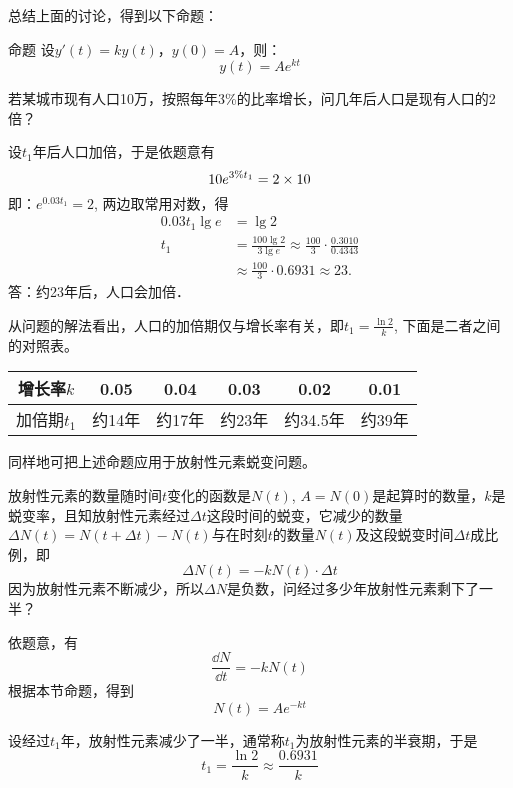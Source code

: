总结上面的讨论，得到以下命题：

\begin{blk}{命题}
    设$y'(t)=ky(t)$，$y(0)=A$，则：
    \[y(t)=Ae^{kt}\]
\end{blk}




\begin{example}
    若某城市现有人口10万，按照每年3\%的比率增长，问几年后人口是现有人口的2倍？
\end{example}

\begin{solution}
    设$t_1$年后人口加倍，于是依题意有
\[10e^{3\%t_1}=2\times10\]
即：$e^{0.03t_1}=2$, 两边取常用对数，得
\[\begin{split}
    0.03t_1\lg e&=\lg2\\
t_1&= \frac{100\lg2}{3\lg e}\approx \frac{100}{3}\cdot\frac{0.3010}{0. 4343}\\
&\approx \frac{100}{3}\cdot 0.6931\approx 23.
\end{split} \]
答：约23年后，人口会加倍．
\end{solution}

从问题的解法看出，人口的加倍期仅与增长率有关，即$t_1=\frac{\ln2}{k}$, 下面是二者之间的对照表。

\begin{center}
\begin{tabular}{c|ccccc}
\hline
    增长率$k$ & 0.05&0.04&0.03&0.02&0.01\\
\hline
加倍期$t_1$ & 约14年& 约17年& 约23年& 约34.5年& 约39年\\
\hline
        \end{tabular}
\end{center}

同样地可把上述命题应用于放射性元素蜕变问题。

\begin{example}
    放射性元素的数量随时间$t$变化的函数是$N(t)$, $A=N(0)$是起算时的数量，$k$是蜕变率，且知放射性元素经过$\Delta t$这段时间的蜕变，它减少的数量$\Delta N(t)=N(t+\Delta t)-N(t)$与在时刻$t$的数量$N(t)$及这段蜕变时间$\Delta t$成比
例，即
\[\Delta N (t) =-kN (t) \cdot \Delta t\]
因为放射性元素不断减少，所以$\Delta N$是负数，问经过多少年放射性元素剩下了一半？
\end{example}

\begin{solution}
    依题意，有
\[\frac{\dd N}{\dd t}=-kN (t) \]
根据本节命题，得到
\[N (t) =Ae^{-kt}\]

设经过$t_1$年，放射性元素减少了一半，通常称$t_1$为放射性元素的半衰期，于是
\[t_1=\frac{\ln 2}{k}\approx \frac{0. 6931}{k}\]
\end{solution}

